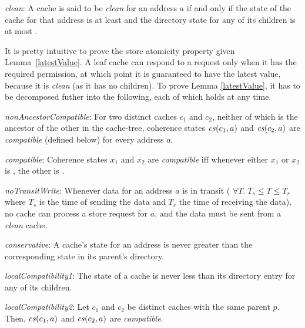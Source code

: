 \vspace{-.15in}

\begin{defn}
\textit{clean}: A cache is said to be \textit{clean} for an address $a$ if and only if
the state of the cache for that address is at least \Sh{} and the directory 
state for any of its children is at most \Sh.
\label{clean}
\end{defn}

It is pretty intuitive to prove the store atomicity property given
Lemma~\ref{latestValue}. A leaf cache can respond to a request only when it
has the required permission, at which point it is guaranteed to have the latest
value, because it is \textit{clean} (as it has no children). To prove Lemma
\ref{latestValue}, it has to be decomposed futher into the following, each of
which holds at any time.

\begin{lemma}
\textit{nonAncestorCompatible}: For two distinct caches $c_1$ and $c_2$, neither of which is the
ancestor of the other in the cache-tree,
coherence states $\mathit{cs}(c_1,a)$ and $\mathit{cs}(c_2,a)$ are
\textit{compatible} (defined below) for every address $a$.
\label{nonAncestorCompatible}
\end{lemma}
\begin{defn}
\textit{compatible}: Coherence states $x_1$ and $x_2$ are \textit{compatible}
iff whenever either $x_1$ or $x_2$ is \Mo{}, the other is \In.
\label{compatible}
\end{defn}

\begin{lemma}
\textit{noTransitWrite}: Whenever data for an address $a$ is in transit (\ie{}
$\forall T. \; T_s \le T \le T_r$ where $T_s$ is the time of sending the data and
$T_r$ the time of receiving the data), no cache can process a store request for
$a$, and the data must be sent from a \textit{clean} cache.
\label{noTransitWrite}
\end{lemma}

\begin{lemma}
\textit{conservative}: A cache's state for an address is never greater than
the corresponding state in its parent's directory.
\label{conservative}
\end{lemma}

\begin{lemma}
\textit{localCompatibility1}:
The state of a cache is never less than its directory entry for any of
its children.
\label{localCompatibility1}
\end{lemma}
\begin{lemma}
\textit{localCompatibility2}: Let $c_1$ and $c_2$ be distinct caches with the
same parent $p$. Then, $\mathit{cs}(c_1, a)$ and $\mathit{cs}(c_2, a)$ are
\textit{compatible}.
\label{localCompatibility2}
\end{lemma}

